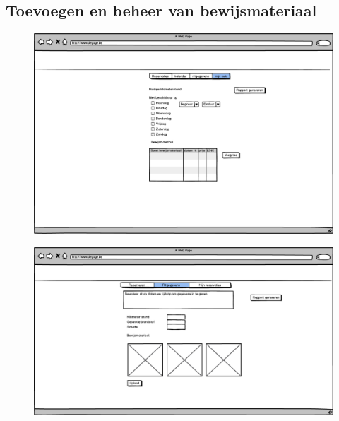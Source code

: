 \documentclass[11pt,a4paper,oneside]{article}
\begin{document}
\subsection{Toevoegen en beheer van bewijsmateriaal}
\begin{figure}[H]\includegraphics[width=\textwidth]{../../mockups/autobeheer_mijnauto.png}\end{figure}
\begin{figure}[H]\includegraphics[width=\textwidth]{../../mockups/delen_ritgegevens.png}\end{figure}
\end{document}
